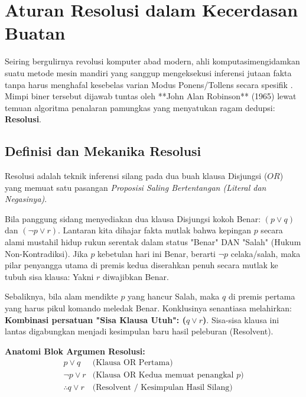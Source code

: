 \section{Aturan Resolusi dalam Kecerdasan Buatan}

Seiring bergulirnya revolusi komputer abad modern, ahli komputasimengidamkan suatu metode mesin mandiri yang sanggup mengeksekusi inferensi jutaan fakta tanpa harus menghafal kesebelas varian Modus Ponens/Tollens secara spesifik \cite{rosen2019}. Mimpi biner tersebut dijawab tuntas oleh **John Alan Robinson** (1965) lewat temuan algoritma penalaran pamungkas yang menyatukan ragam dedupsi: \textbf{Resolusi}.

\subsection{Definisi dan Mekanika Resolusi}

Resolusi adalah teknik inferensi silang pada dua buah klausa Disjungsi ($OR$) yang memuat satu pasangan \textit{Proposisi Saling Bertentangan (Literal dan Negasinya)}.

\begin{teorema}
Bila panggung sidang menyediakan dua klausa Disjungsi kokoh Benar: $(p \lor q)$ dan $(\neg p \lor r)$. Lantaran kita dihajar fakta mutlak bahwa kepingan $p$ secara alami mustahil hidup rukun serentak dalam status "Benar" DAN "Salah" (Hukum Non-Kontradiksi). Jika $p$ kebetulan hari ini Benar, berarti $\neg p$ celaka/salah, maka pilar penyangga utama di premis kedua diserahkan penuh secara mutlak ke tubuh sisa klausa: Yakni $r$ diwajibkan Benar. 

Sebaliknya, bila alam mendikte $p$ yang hancur Salah, maka $q$ di premis pertama yang harus pikul komando meledak Benar. Konklusinya senantiasa melahirkan: \textbf{Kombinasi persatuan "Sisa Klausa Utuh": ($q \lor r$)}. Sisa-sisa klausa ini lantas digabungkan menjadi kesimpulan baru hasil peleburan (Resolvent).
\end{teorema}

\textbf{Anatomi Blok Argumen Resolusi:}
\[
\begin{array}{cl}
p \vee q & \text{(Klausa OR Pertama)} \\
\neg p \vee r & \text{(Klausa OR Kedua memuat penangkal } p) \\
\hline
\therefore q \vee r & \text{(Resolvent / Kesimpulan Hasil Silang)}
\end{array}
\]

